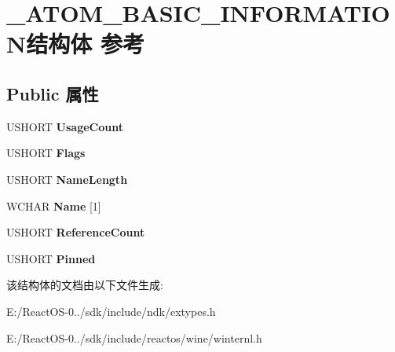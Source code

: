 \hypertarget{struct___a_t_o_m___b_a_s_i_c___i_n_f_o_r_m_a_t_i_o_n}{}\section{\+\_\+\+A\+T\+O\+M\+\_\+\+B\+A\+S\+I\+C\+\_\+\+I\+N\+F\+O\+R\+M\+A\+T\+I\+O\+N结构体 参考}
\label{struct___a_t_o_m___b_a_s_i_c___i_n_f_o_r_m_a_t_i_o_n}
\subsection*{Public 属性}
\begin{DoxyCompactItemize}
\item 
\mbox{\label{struct___a_t_o_m___b_a_s_i_c___i_n_f_o_r_m_a_t_i_o_n_a897bd66538f9827eb13c393eb25dd07f}} 
U\+S\+H\+O\+RT {\bfseries Usage\+Count}
\item 
\mbox{\label{struct___a_t_o_m___b_a_s_i_c___i_n_f_o_r_m_a_t_i_o_n_aa8ff7ad18ad07e80035e58585601bcad}} 
U\+S\+H\+O\+RT {\bfseries Flags}
\item 
\mbox{\label{struct___a_t_o_m___b_a_s_i_c___i_n_f_o_r_m_a_t_i_o_n_a75da2dcb15ab15dba100fad4f1050f9f}} 
U\+S\+H\+O\+RT {\bfseries Name\+Length}
\item 
\mbox{\label{struct___a_t_o_m___b_a_s_i_c___i_n_f_o_r_m_a_t_i_o_n_a531b9f27ec925d39a5fcb21cc1d9fb4a}} 
W\+C\+H\+AR {\bfseries Name} \mbox{[}1\mbox{]}
\item 
\mbox{\label{struct___a_t_o_m___b_a_s_i_c___i_n_f_o_r_m_a_t_i_o_n_aebdfe8e12e9da86c0b10639b7e2cc62d}} 
U\+S\+H\+O\+RT {\bfseries Reference\+Count}
\item 
\mbox{\label{struct___a_t_o_m___b_a_s_i_c___i_n_f_o_r_m_a_t_i_o_n_a3deb0cdefeeddf7d9da9594622fa16ad}} 
U\+S\+H\+O\+RT {\bfseries Pinned}
\end{DoxyCompactItemize}


该结构体的文档由以下文件生成\+:\begin{DoxyCompactItemize}
\item 
E\+:/\+React\+O\+S-\/0../sdk/include/ndk/extypes.\+h\item 
E\+:/\+React\+O\+S-\/0../sdk/include/reactos/wine/winternl.\+h\end{DoxyCompactItemize}
